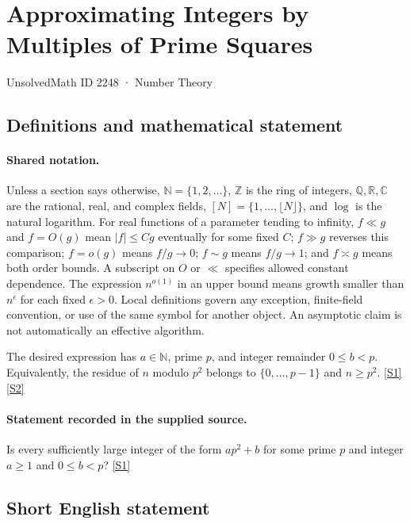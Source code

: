 \documentclass[11pt,a4paper]{article}
\newcommand{\N}{\mathbb{N}}
\newcommand{\Z}{\mathbb{Z}}
\newcommand{\Q}{\mathbb{Q}}
\newcommand{\R}{\mathbb{R}}
\newcommand{\C}{\mathbb{C}}
\newcommand{\sref}[2]{\hyperlink{source:#1:#2}{[S#2]}}
\begin{document}

\setcounter{section}{2247}

\section{Approximating Integers by Multiples of Prime Squares}\label{2248}

{\small\sffamily UnsolvedMath ID 2248 · Number Theory}

\subsection{Definitions and mathematical statement}

\paragraph{Shared notation.}Unless a section says otherwise, $\N=\{1,2,\ldots\}$,
$\Z$ is the ring of integers, $\Q,\R,\C$ are the rational, real, and complex
fields, $[N]=\{1,\ldots,\lfloor N\rfloor\}$, and $\log$ is the natural
logarithm. For real functions of a parameter tending to infinity,
$f\ll g$ and $f=O(g)$ mean $|f|\leq Cg$ eventually for some fixed $C$;
$f\gg g$ reverses this comparison; $f=o(g)$ means $f/g\to0$;
$f\sim g$ means $f/g\to1$; and $f\asymp g$ means both order bounds.
A subscript on $O$ or $\ll$ specifies allowed constant dependence.
The expression $n^{o(1)}$ in an upper bound means growth smaller than
$n^\epsilon$ for each fixed $\epsilon>0$. Local definitions govern any
exception, finite-field convention, or use of the same symbol for another
object. An asymptotic claim is not automatically an effective algorithm.



The desired expression has $a\in\N$, prime $p$, and integer remainder $0\leq b<p$. Equivalently, the residue of $n$ modulo $p^2$ belongs to $\{0,\ldots,p-1\}$ and $n\geq p^2$. \sref{2248}{1} \sref{2248}{2}

\paragraph{Statement recorded in the supplied source.}
Is every sufficiently large integer of the form $ ap^2+b $ for some prime $p$ and integer $a\geq 1$ and $0\leq b<p$? \sref{2248}{1}

\subsection{Short English statement}
\end{document}
